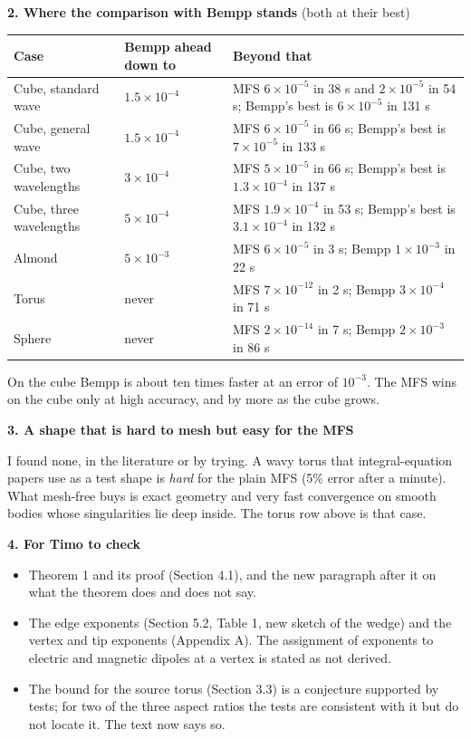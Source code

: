 \documentclass[11pt]{article}
\begin{document}
\textbf{2. Where the comparison with Bempp stands} (both at their best)

{\small
\begin{tabular}{@{}>{\raggedright}p{2.5cm}>{\raggedright}p{2.1cm}>{\raggedright\arraybackslash}p{7.4cm}@{}}
\toprule
Case & Bempp ahead down to & Beyond that \\
\midrule
Cube, standard wave & $1.5\times10^{-4}$ & MFS $6\times10^{-5}$ in 38 s and $2\times10^{-5}$ in 54 s; Bempp's best is $6\times10^{-5}$ in 131 s \\
Cube, general wave & $1.5\times10^{-4}$ & MFS $6\times10^{-5}$ in 66 s; Bempp's best is $7\times10^{-5}$ in 133 s \\
Cube, two wavelengths & $3\times10^{-4}$ & MFS $5\times10^{-5}$ in 66 s; Bempp's best is $1.3\times10^{-4}$ in 137 s \\
Cube, three wavelengths & $5\times10^{-4}$ & MFS $1.9\times10^{-4}$ in 53 s; Bempp's best is $3.1\times10^{-4}$ in 132 s \\
Almond & $5\times10^{-3}$ & MFS $6\times10^{-5}$ in 3 s; Bempp $1\times10^{-3}$ in 22 s \\
Torus & never & MFS $7\times10^{-12}$ in 2 s; Bempp $3\times10^{-4}$ in 71 s \\
Sphere & never & MFS $2\times10^{-14}$ in 7 s; Bempp $2\times10^{-3}$ in 86 s \\
\bottomrule
\end{tabular}}

On the cube Bempp is about ten times faster at an error of $10^{-3}$. The MFS wins on the cube only at high accuracy, and by more as the cube grows.

\textbf{3. A shape that is hard to mesh but easy for the MFS}

I found none, in the literature or by trying. A wavy torus that integral-equation papers use as a test shape is \emph{hard} for the plain MFS (5\% error after a minute). What mesh-free buys is exact geometry and very fast convergence on smooth bodies whose singularities lie deep inside. The torus row above is that case.

\textbf{4. For Timo to check}
\begin{itemize}
\item Theorem 1 and its proof (Section 4.1), and the new paragraph after it on what the theorem does and does not say.
\item The edge exponents (Section 5.2, Table 1, new sketch of the wedge) and the vertex and tip exponents (Appendix A). The assignment of exponents to electric and magnetic dipoles at a vertex is stated as not derived.
\item The bound for the source torus (Section 3.3) is a conjecture supported by tests; for two of the three aspect ratios the tests are consistent with it but do not locate it. The text now says so.
\end{itemize}
\end{document}
